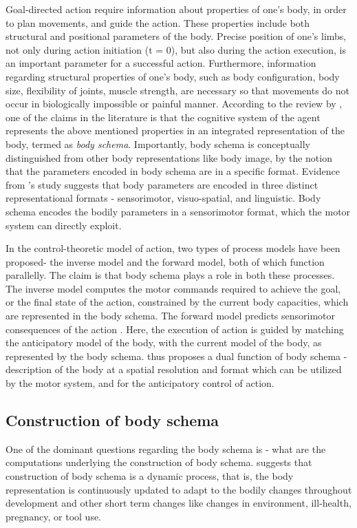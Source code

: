 Goal-directed action require information about properties of one's body, in order to plan movements, and guide the action. These properties include both structural and positional parameters of the body. Precise position of one's limbs, not only during action initiation (t = 0), but also during the action execution, is an important parameter for a successful action. Furthermore, information regarding structural properties of one's body, such as body configuration, body size, flexibility of joints, muscle strength, are necessary so that movements do not occur in biologically impossible or painful manner. According to the review by , one of the claims in the literature is that the cognitive system of the agent represents the above mentioned properties in an integrated representation of the body, termed as \emph{body schema}. Importantly, body schema is conceptually distinguished from other body representations like body image, by the notion that the parameters encoded in body schema are in a specific format. Evidence from 's study suggests that body parameters are encoded in three distinct representational formats - sensorimotor, visuo-spatial, and linguistic. Body schema encodes the bodily parameters in a sensorimotor format, which the motor system can directly exploit.

In the control-theoretic model of action, two types of process models have been proposed- the inverse model and the forward model, both of which function parallelly. The claim is that body schema plays a role in both these processes. The inverse model computes the motor commands required to achieve the goal, or the final state of the action, constrained by the current body capacities, which are represented in the body schema.  The forward model predicts sensorimotor consequences of the action \cite{wolpert2001motor}. Here, the execution of action is guided by matching the anticipatory model of the body, with the current model of the body, as represented by the body schema.  thus proposes a dual function of body schema - description of the body at a spatial resolution and format which can be utilized by the motor system, and for the anticipatory control of action.

\subsection{Construction of body schema}

One of the dominant questions regarding the body schema is -  what are the computations underlying the construction of body schema.  suggests that construction of body schema is a dynamic process, that is, the body representation is continuously updated to adapt to the bodily changes throughout development and other short term changes like changes in environment, ill-health, pregnancy, or tool use. 

